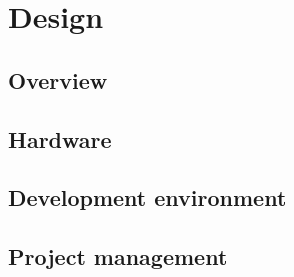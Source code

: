 \section{Design}
\subsection{Overview}
\subsection{Hardware}
\subsection{Development environment}
\subsection{Project management}
